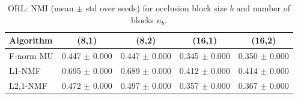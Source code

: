 \begin{table}[t]
\centering
\caption{ORL: NMI (mean $\pm$ std over seeds) for occlusion block size $b$ and number of blocks $n_b$.}
\begin{tabular}{lcccc}
\toprule
Algorithm & (8,1) & (8,2) & (16,1) & (16,2) \\
\midrule
F-norm MU & 0.447 $\pm$ 0.000 & 0.447 $\pm$ 0.000 & 0.345 $\pm$ 0.000 & 0.350 $\pm$ 0.000 \\
L1-NMF & 0.695 $\pm$ 0.000 & 0.689 $\pm$ 0.000 & 0.412 $\pm$ 0.000 & 0.414 $\pm$ 0.000 \\
L2,1-NMF & 0.472 $\pm$ 0.000 & 0.497 $\pm$ 0.000 & 0.357 $\pm$ 0.000 & 0.367 $\pm$ 0.000 \\
\bottomrule
\end{tabular}
\end{table}
